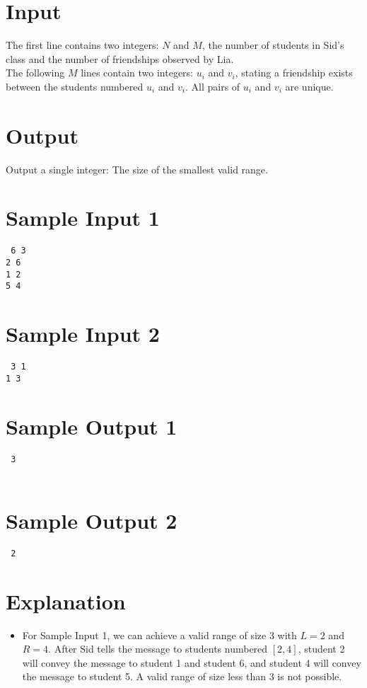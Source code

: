 \documentclass{article}
\begin{document}
\section*{Input}
The first line contains two integers: $N$ and $M$, the number of students in Sid’s class and the number of friendships observed by Lia. \\

The following $M$ lines contain two integers: $u_i$ and $v_i$, stating a friendship exists between the students numbered $u_i$ and $v_i$. All pairs of $u_i$ and $v_i$ are unique.


\section*{Output}
Output a single integer: The size of the smallest valid range.

\begin{multicols}{2}
\section*{Sample Input 1}
{\tt
6 3\\
2 6\\
1 2\\
5 4}
\section*{Sample Input 2}
{\tt
3 1\\
1 3}
\columnbreak
\section*{Sample Output 1}
{\tt
3
}
\\\\
\section*{Sample Output 2}
{\tt
2
}
\end{multicols}

\section*{Explanation}
\begin{itemize}
\item For Sample Input 1, we can achieve a valid range of size 3 with $L = 2$ and $R = 4$. After Sid tells the
message to students numbered $[2,4]$, student 2 will convey the message to student 1 and student 6,
and student 4 will convey the message to student 5. A valid range of size less than 3 is not possible.
\end{itemize}
\end{document}
